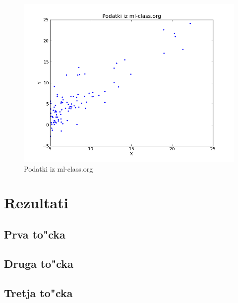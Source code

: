 \documentclass[a4paper,11pt]{article}
\begin{document}
\begin{figure}[H]
\begin{center}
\includegraphics[scale=0.3]{ml-data.png}
\caption{Podatki iz ml-class.org}
\end{center}
\label{mldata}
\end{figure}

\section{Rezultati}
\subsection{Prva to"cka}
\subsection{Druga to"cka}
\subsection{Tretja to"cka}
\end{document}
